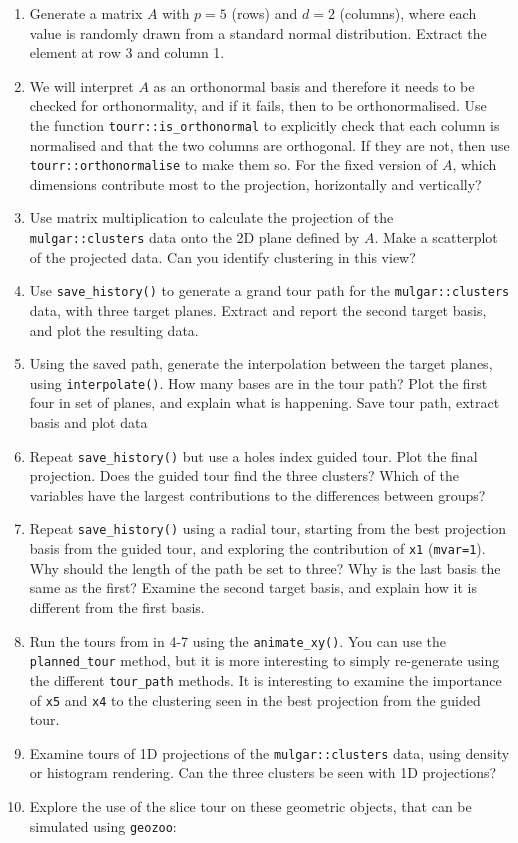 \documentclass[
  letterpaper,
]{krantz}
\providecommand{\tightlist}{%
  \setlength{\itemsep}{0pt}\setlength{\parskip}{0pt}}\usepackage{longtable,booktabs,array}
\begin{document}
\begin{enumerate}
\def\labelenumi{\arabic{enumi}.}
\tightlist
\item
  Generate a matrix \(A\) with \(p=5\) (rows) and \(d=2\) (columns),
  where each value is randomly drawn from a standard normal
  distribution. Extract the element at row 3 and column 1.
\item
  We will interpret \(A\) as an orthonormal basis and therefore it needs
  to be checked for orthonormality, and if it fails, then to be
  orthonormalised. Use the function \texttt{tourr::is\_orthonormal} to
  explicitly check that each column is normalised and that the two
  columns are orthogonal. If they are not, then use
  \texttt{tourr::orthonormalise} to make them so. For the fixed version
  of \(A\), which dimensions contribute most to the projection,
  horizontally and vertically?
\item
  Use matrix multiplication to calculate the projection of the
  \texttt{mulgar::clusters} data onto the 2D plane defined by \(A\).
  Make a scatterplot of the projected data. Can you identify clustering
  in this view?
\item
  Use \texttt{save\_history()} to generate a grand tour path for the
  \texttt{mulgar::clusters} data, with three target planes. Extract and
  report the second target basis, and plot the resulting data.
\item
  Using the saved path, generate the interpolation between the target
  planes, using \texttt{interpolate()}. How many bases are in the tour
  path? Plot the first four in set of planes, and explain what is
  happening. Save tour path, extract basis and plot data
\item
  Repeat \texttt{save\_history()} but use a holes index guided tour.
  Plot the final projection. Does the guided tour find the three
  clusters? Which of the variables have the largest contributions to the
  differences between groups?
\item
  Repeat \texttt{save\_history()} using a radial tour, starting from the
  best projection basis from the guided tour, and exploring the
  contribution of \texttt{x1} (\texttt{mvar=1}). Why should the length
  of the path be set to three? Why is the last basis the same as the
  first? Examine the second target basis, and explain how it is
  different from the first basis.
\item
  Run the tours from in 4-7 using the \texttt{animate\_xy()}. You can
  use the \texttt{planned\_tour} method, but it is more interesting to
  simply re-generate using the different \texttt{tour\_path} methods. It
  is interesting to examine the importance of \texttt{x5} and
  \texttt{x4} to the clustering seen in the best projection from the
  guided tour.
\item
  Examine tours of 1D projections of the \texttt{mulgar::clusters} data,
  using density or histogram rendering. Can the three clusters be seen
  with 1D projections?
\item
  Explore the use of the slice tour on these geometric objects, that can
  be simulated using \texttt{geozoo}:
\end{enumerate}
\end{document}
